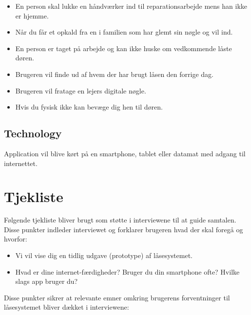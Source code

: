 \documentclass[a4paper,12pt]{article}
\begin{document}
\begin{itemize}
    \item En person skal lukke en håndværker ind til reparationsarbejde mens han
ikke er hjemme.
    \item Når du får et opkald fra en i familien som har glemt sin nøgle og vil ind.
    \item En person er taget på arbejde og kan ikke huske om vedkommende låste døren.
    \item Brugeren vil finde ud af hvem der har brugt låsen den forrige dag.
    \item Brugeren vil fratage en lejers digitale nøgle.
    \item Hvis du fysisk ikke kan bevæge dig hen til døren.
\end{itemize}

\subsection{Technology}
Application vil blive kørt på en smartphone, tablet eller datamat med adgang til internettet.

\section{Tjekliste}
Følgende tjekliste bliver brugt som støtte i interviewene til at guide samtalen. \\
Disse punkter indleder interviewet og forklarer brugeren hvad der skal foregå og hvorfor:

\begin{itemize}
    \item Vi vil vise dig en tidlig udgave (prototype) af låsesystemet.
    \item Hvad er dine internet-færdigheder? Bruger du din smartphone ofte? Hvilke slags app bruger du?
\end{itemize}

Disse punkter sikrer at relevante emner omkring brugerens forventninger til låsesystemet bliver dækket i interviewene:
\end{document}
